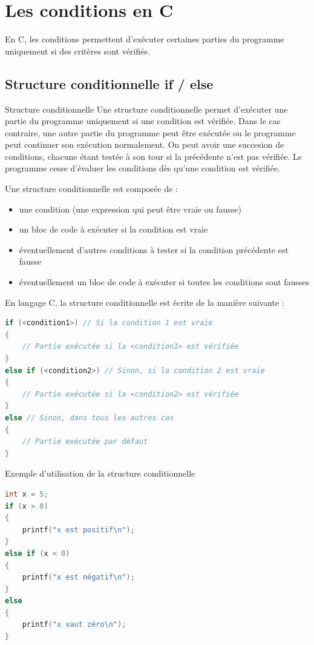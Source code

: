 
\section{Les conditions en C}

En C, les conditions permettent d'exécuter certaines parties du programme uniquement si des critères sont vérifiés.

\subsection{Structure conditionnelle if / else}
\begin{UPSTIinfor}{Structure conditionnelle}
	Une structure conditionnelle permet d'exécuter une partie du programme uniquement si une condition est vérifiée. Dans le cas contraire, une autre partie du programme peut être exécutée ou le programme peut continuer son exécution normalement. 
	On peut avoir une succesion de conditions, chacune étant testée à son tour si la précédente n'est pas vérifiée. Le programme cesse d'évaluer les conditions dès qu'une condition est vérifiée.

	Une structure conditionnelle est composée de :
	\begin{itemize}
		\item une condition (une expression qui peut être vraie ou fausse)
		\item un bloc de code à exécuter si la condition est vraie
		\item éventuellement d'autres conditions à tester si la condition précédente est fausse
		\item éventuellement un bloc de code à exécuter si toutes les conditions sont fausses
	\end{itemize}
	
\end{UPSTIinfor}

En langage C, la structure conditionnelle est écrite de la manière suivante :

\begin{lstlisting}[language=c]
if (<condition1>) // Si la condition 1 est vraie
{
    // Partie exécutée si la <condition1> est vérifiée
}
else if (<condition2>) // Sinon, si la condition 2 est vraie
{
    // Partie exécutée si la <condition2> est vérifiée
}
else // Sinon, dans tous les autres cas
{
    // Partie exécutée par défaut
}
\end{lstlisting}

Exemple d'utilisation de la structure conditionnelle
	\begin{lstlisting}[language=c]
int x = 5;
if (x > 0)
{
	printf("x est positif\n");	
}
else if (x < 0)
{
	printf("x est négatif\n");
}
else
{
	printf("x vaut zéro\n");
}
	\end{lstlisting}

